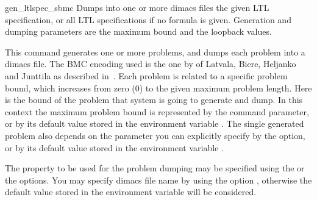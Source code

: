 \begin{nusmvCommand} {gen\_ltlspec\_sbmc} {\label{genLtlspecSbmc} 
Dumps into one or more dimacs files the given LTL specification, or
all LTL specifications if no formula is given. Generation and dumping
parameters are the maximum bound and the loopback values.}


This command generates one or more problems, and dumps each problem
into a dimacs file. The BMC encoding used is the one by of Latvala,
Biere, Heljanko and Junttila as described in~\cite{vmcai05}.
%
Each problem is related to a specific problem bound, which
increases from zero ($0$) to the given maximum problem length. Here
 is the bound of the problem that system is going to
generate and dump.  In this context the maximum problem bound is
represented by the  command parameter, or by its default
value stored in the environment variable .  The
single generated problem also depends on the  parameter
you can explicitly specify by the  option, or by its
default value stored in the environment variable
.

The property to be used for the problem dumping may be specified
using the  or the  options.
You may specify dimacs file name by using the option , otherwise the default value stored in the environment
variable  will be considered.

\begin{cmdOpt}

       
            



\end{cmdOpt}
\end{nusmvCommand}
